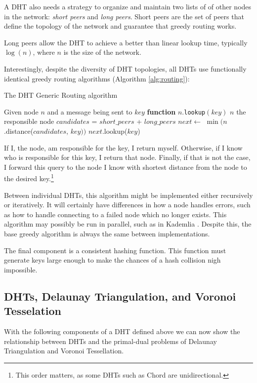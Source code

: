 \documentclass[11pt,conference]{IEEEtran}
\begin{document}
A DHT also needs a strategy to organize and maintain two lists of of other nodes in the network: \textit{short peers} and \textit{long peers}.
Short peers are the set of peers that define the topology of the network and guarantee that greedy routing works.

Long peers allow the DHT to achieve a better than linear lookup time, typically $ \log(n) $, where $n$ is the size of the network. 

Interestingly, despite the diversity of DHT topologies, all DHTs use functionally identical greedy routing algorithms (Algorithm \ref{alg:routing}):

\begin{algorithm}
	\caption{The DHT Generic Routing algorithm}
	\label{alg:routing}
	\begin{algorithmic}[1]
		\STATE Given node $n$ and a message being sent to $key$
		\STATE \textbf{function} $n.$\texttt{lookup}$(key)$
			\RETURN $ n $
		\ENDIF
			\RETURN the responsible node
		\ENDIF
		\STATE $ candidates $ = $ short\_peers $ + $ long\_peers $
		\STATE $ next  \leftarrow $  $\min (n$.distance($candidates$, $ key ))$
		\RETURN $next.$lookup($key$)
	\end{algorithmic}
	
	\scriptsize
\end{algorithm}
If I, the node, am responsible for the key, I return myself.
Otherwise, if I know who is responsible for this key, I return that node.
Finally, if that is not the case, I forward this query to the node I know with shortest distance from the node to the desired key.\footnote{This order matters, as some DHTs such as Chord are unidirectional.} 

Between individual DHTs, this algorithm might be implemented either recursively or iteratively.
It will certainly have differences in how a node handles errors, such as how to handle connecting to a failed node which no longer exists.
This algorithm may possibly be  run in parallel, such as in Kademlia \cite{kademlia}.
Despite this, the base greedy algorithm is always the same between implementations.

The final component is a consistent hashing function.
This function must generate keys large enough to make the chances of a hash collision nigh impossible.



\subsection{DHTs, Delaunay Triangulation, and Voronoi Tesselation}
With the following components of a DHT defined above we can now show the relationship between DHTs and the primal-dual problems of Delaunay Triangulation and Voronoi Tessellation.
\end{document}
